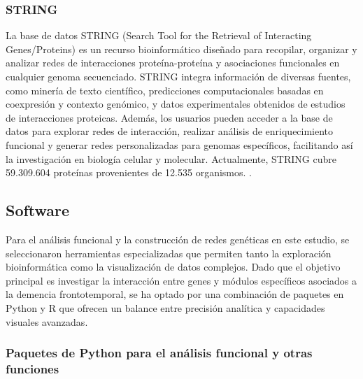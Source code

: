 \subsubsection*{STRING}
La base de datos STRING (Search Tool for the Retrieval of Interacting Genes/Proteins) es un recurso bioinformático diseñado para recopilar, organizar y analizar redes de interacciones proteína-proteína y asociaciones funcionales en cualquier genoma secuenciado. STRING integra información de diversas fuentes, como minería de texto científico, predicciones computacionales basadas en coexpresión y contexto genómico, y datos experimentales obtenidos de estudios de interacciones proteicas. Además, los usuarios pueden acceder a la base de datos para explorar redes de interacción, realizar análisis de enriquecimiento funcional y generar redes personalizadas para genomas específicos, facilitando así la investigación en biología celular y molecular. Actualmente, STRING cubre 59.309.604 proteínas provenientes de 12.535 organismos.  \cite{szklarczyk2023stringdb}.

\subsection{Software}

Para el análisis funcional y la construcción de redes genéticas en este estudio, se seleccionaron herramientas especializadas que permiten tanto la exploración bioinformática como la visualización de datos complejos. Dado que el objetivo principal es investigar la interacción entre genes y módulos específicos asociados a la demencia frontotemporal, se ha optado por una combinación de paquetes en Python y R que ofrecen un balance entre precisión analítica y capacidades visuales avanzadas.

\subsubsection*{Paquetes de Python para el análisis funcional y otras funciones}

